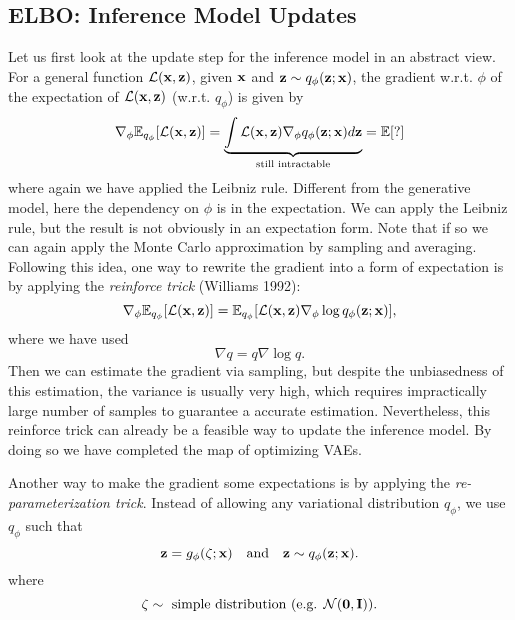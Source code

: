 \documentclass[../book-template.tex]{subfiles}
\begin{document}
\subsection{ELBO: Inference Model Updates}
Let us first look at the update step for the inference model in an abstract view. For a general function $\mathcal{L}({\bf x,z})$, given ${\bf x}$ and ${\bf z}\sim q_\phi({\bf z};{\bf x})$, the gradient w.r.t. $\phi$ of the expectation of $\mathcal{L}({\bf x,z})$ (w.r.t. $q_\phi$) is given by
\begin{equation*}
	\nabla_\phi \mathbb{E}_{q_\phi}[\mathcal{L}({\bf x,z})] = \underbrace{\int \mathcal{L}({\bf x,z}) \nabla_\phi q_\phi({\bf z};{\bf x})d{\bf z}}_{\text{still intractable}}=\mathbb{E}[?]
\end{equation*}
where again we have applied the Leibniz rule. Different from the generative model, here the dependency on $\phi$ is in the expectation. We can apply the Leibniz rule, but the result is not obviously in an expectation form. Note that if so we can again apply the Monte Carlo approximation by sampling and averaging. Following this idea, one way to rewrite the gradient into a form of expectation is by applying the \emph{reinforce trick} (Williams 1992):
\begin{equation*}
		\nabla_\phi \mathbb{E}_{q_\phi}[\mathcal{L}({\bf x,z})] =  \mathbb{E}_{q_\phi}[\mathcal{L}({\bf x,z})	\nabla_\phi\log q_\phi({\bf z};{\bf x})],
\end{equation*}
where we have used
\begin{equation*}
	\nabla q = q\nabla\log q.
\end{equation*}
Then we can estimate the gradient via sampling, but despite the unbiasedness of this estimation, the variance is usually very high, which requires impractically large number of samples to guarantee a accurate estimation. Nevertheless, this reinforce trick can already be a feasible way to update the inference model. By doing so we have completed the map of optimizing VAEs.
\par Another way to make the gradient some expectations is by applying the \emph{re-parameterization trick}. Instead of allowing any variational distribution $q_\phi$, we use $q_\phi$ such that
\begin{equation*}
	{\bf z} = g_\phi(\zeta;{\bf x})\quad \text{and}\quad{\bf z}\sim q_\phi({\bf z};{\bf x}).
\end{equation*}
where
\begin{equation*}
	\zeta\sim \text{ simple distribution (e.g. }\mathcal{N}({\bf 0,I})).
\end{equation*}
\end{document}
